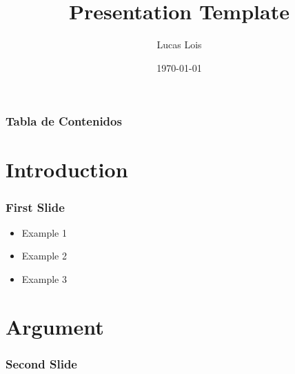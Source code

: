 \documentclass{beamer}
\title{Presentation Template}
\author[Lois]{
  Lucas Lois
}
\institute[]{Universidad Católica del Uruguay}
\date{\today}
\begin{document}
\frame{\titlepage}

\begin{frame}
\frametitle{Tabla de Contenidos}
\tableofcontents
\end{frame}

\section{Introduction}

\begin{frame}
  \frametitle{First Slide}

  \begin{itemize}
    \item<1> Example 1
    \item<2-> Example 2
    \item<3-> Example 3
  \end{itemize}
\end{frame}

\section{Argument}

\begin{frame}
  \frametitle{Second Slide}

  \blindtext
\end{frame}
\end{document}
